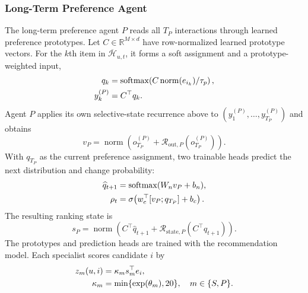 \documentclass[11pt]{article}
\newcommand{\norm}[1]{\operatorname{norm}(#1)}
\newcommand{\softmax}{\operatorname{softmax}}
\begin{document}
\subsubsection{Long-Term Preference Agent}
The long-term preference agent $P$ reads all $T_P$ interactions through learned preference prototypes. Let $C\in\mathbb R^{M\times d}$ have row-normalized learned prototype vectors. For the $k$th item in $\overline{\mathcal H}_{u,t}$, it forms a soft assignment and a prototype-weighted input,
\begin{align}
 q_k&=\softmax\!\left(C\norm{e_{i_k}}/\tau_p\right),\notag\\
 y_k^{(P)}&=C^\top q_k.
\end{align}
Agent $P$ applies its own selective-state recurrence above to $(y_1^{(P)},\ldots,y_{T_P}^{(P)})$ and obtains
\begin{equation}
 v_P=\norm{o_{T_P}^{(P)}+\mathcal R_{\mathrm{out},P}(o_{T_P}^{(P)})}.
\end{equation}
With $q_{T_P}$ as the current preference assignment, two trainable heads predict the next distribution and change probability:
\begin{align}
 \widehat q_{t+1}&=\softmax(W_n v_P+b_n),\notag\\
 \rho_t&=\sigma\!\left(w_c^\top[v_P;q_{T_P}]+b_c\right).
\end{align}
The resulting ranking state is
\begin{equation}
 s_P=\norm{C^\top\widehat q_{t+1}+\mathcal R_{\mathrm{state},P}(C^\top\widehat q_{t+1})}.
\end{equation}
The prototypes and prediction heads are trained with the recommendation model. Each specialist scores candidate $i$ by
\begin{align}
 z_m(u,i)&=\kappa_m s_m^\top e_i,\notag\\
 \kappa_m&=\min\{\exp(\theta_m),20\},\quad m\in\{S,P\}.
\end{align}
\end{document}
